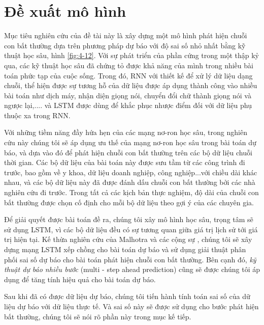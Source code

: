 \section{Đề xuất mô hình}
Mục tiêu nghiên cứu của đề tài này là xây dựng một mô hình phát hiện chuỗi con bất thường dựa trên phương pháp dự báo với độ sai số nhỏ nhất bằng kỹ thuật học sâu, hình \ref{fig:4-12}. Với sự phát triển của phần cứng trong một thập kỷ qua, các kỹ thuật học sâu đã chứng tỏ được khả năng của mình trong nhiều bài toán phức tạp của cuộc sống. Trong đó, RNN với thiết kế để xử lý dữ liệu dạng chuỗi, thể hiện được sự tương hỗ của dữ liệu được áp dụng thành công vào nhiều bài toán như dịch máy, nhận diện giọng nói, chuyển đổi chữ thành giọng nói và ngược lại,.... và LSTM được dùng để khắc phục nhược điểm đối với dữ liệu phụ thuộc xa trong RNN.

Với những tiềm năng đầy hứa hẹn của các mạng nơ-ron học sâu, trong nghiên cứu này chúng tôi sẽ áp dụng ưu thế của mạng nơ-ron học sâu trong bài toán dự báo, và dựa vào đó để phát hiện chuỗi con bất thường trên các bộ dữ liệu chuỗi thời gian. Các bộ dữ liệu của bài toán này được sưu tầm từ các công trình đi trước, bao gồm về y khoa, dữ liệu doanh nghiệp, công nghiệp...với chiều dài khác nhau, và các bộ dữ liệu này đã được đánh dấu chuỗi con bất thường bởi các nhà nghiên cứu đi trước. Trong tất cả các kịch bản thực nghiệm, độ dài của chuỗi con bất thường được chọn cố định cho mỗi bộ dữ liệu theo gợi ý của các chuyên gia.

Để giải quyết được bài toán đề ra, chúng tôi xây mô hình học sâu, trọng tâm sẽ sử dụng LSTM, vì các bộ dữ liệu đều có sự tương quan giữa giá trị lịch sử tới giá trị hiện tại. Kế thừa nghiên cứu của Malhotra và các cộng sự \cite{st14}, chúng tôi sẽ xây dựng mạng LSTM xếp chồng cho bài toán dự báo và sử dụng giải thuật phân phối sai số dự báo cho bài toán phát hiện chuỗi con bất thường. Bên cạnh đó, \textit{kỹ thuật dự báo nhiều bước} (multi - step ahead prediction) cũng sẽ được chúng tôi áp dụng để tăng tính hiệu quả cho bài toán dự báo.

Sau khi đã có được dữ liệu dự báo, chúng tôi tiến hành tính toán sai số của dữ liệu dự báo với dữ liệu thực tế. Và sai số này sẽ được sử dụng cho bước phát hiện bất thường, chúng tôi sẽ nói rõ phần này trong mục kế tiếp.

